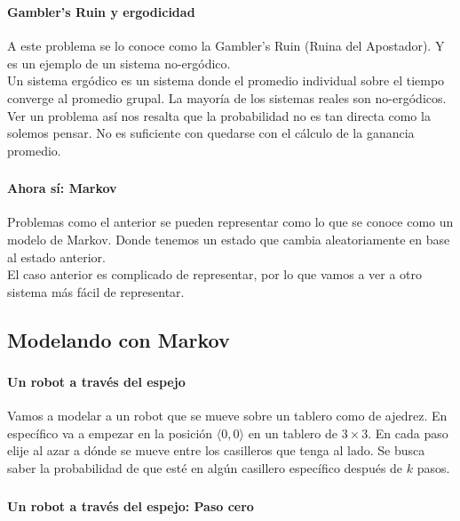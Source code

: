 \documentclass[../main.tex]{subfiles}
\begin{document}
\begin{frame}
  \frametitle{\SECTIONC}
  \framesubtitle{Gambler's Ruin y ergodicidad}

  A este problema se lo conoce como la Gambler's Ruin (Ruina del Apostador). Y es un ejemplo de un sistema no-ergódico. \pause \\
  Un sistema ergódico es un sistema donde el promedio individual sobre el tiempo converge al promedio grupal. \pause La mayoría de los sistemas reales son no-ergódicos. \pause \\
  Ver un problema así nos resalta que la probabilidad no es tan directa como la solemos pensar. No es suficiente con quedarse con el cálculo de la ganancia promedio.
\end{frame}

\begin{frame}
  \frametitle{\SECTIONC}
  \framesubtitle{Ahora sí: Markov}

  Problemas como el anterior se pueden representar como lo que se conoce como un modelo de Markov. Donde tenemos un estado que cambia aleatoriamente en base al estado anterior. \pause \\
  El caso anterior es complicado de representar, por lo que vamos a ver a otro sistema más fácil de representar.

\end{frame}

\subsection{Modelando con Markov}
\newcommand{\EJC}{Un robot a través del espejo}

\begin{frame}
  \frametitle{\SECTIONC}
  \framesubtitle{\EJC}

  Vamos a modelar a un robot que se mueve sobre un tablero como de ajedrez. \pause En específico va a empezar en la posición \(\langle 0, 0 \rangle\) en un tablero de \(3 \times 3\). En cada paso elije al azar a dónde se mueve entre los casilleros que tenga al lado. Se busca saber la probabilidad de que esté en algún casillero específico después de \(k\) pasos.

  \begin{figure}[H]
    \centering
  \end{figure}
\end{frame}

\begin{frame}
  \frametitle{\SECTIONC}
  \framesubtitle{\EJC: Paso cero}

  \begin{figure}[H]
    \centering
  \end{figure}
\end{frame}
\end{document}

